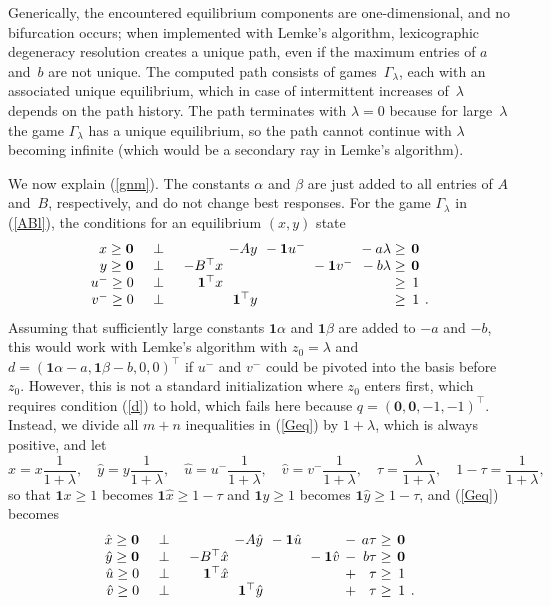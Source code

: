\documentclass[a4paper,12pt]{article}  %
\theoremstyle{definition}
\newcommand{\T}{^{\top}}
\newcommand{\0}{{\mathbf0}}
\newcommand{\1}{{\mathbf1}}
\begin{document}
Generically, the encountered equilibrium components are
one-dimensional, and no bifurcation occurs;
when implemented with Lemke's algorithm, lexicographic
degeneracy resolution creates a unique path, even if the
maximum entries of $a$ and~$b$ are not unique.
The computed path consists of games~$\Gamma_\lambda$, each
with an associated unique equilibrium, which in case of
intermittent increases of~$\lambda$ depends on the path
history.
The path terminates with $\lambda=0$ because for
large~$\lambda$ the game $\Gamma_\lambda$ has a unique
equilibrium, so the path cannot continue with $\lambda$
becoming infinite (which would be a secondary ray in Lemke's
algorithm).

We now explain (\ref{gnm}).
The constants $\alpha$ and $\beta$ are just added to all
entries of $A$ and~$B$, respectively, and do not change best
responses.
For the game $\Gamma_\lambda$ in (\ref{ABl}), the
conditions for an equilibrium $(x,y)$ state
\begin{equation}
\label{Geq}
\arraycolsep.2em
\begin{array}{rcrrllrrr}
x\ge\0&\quad\bot\quad&
&-Ay
&
{}-\1u^-
&&{}-a\lambda\ge&\0
\\
y\ge\0&\quad\bot\quad&
-B\T x&&
&{}-\1v^-
&{}-b\lambda\ge&\0&
\\
u^-\ge0&\quad\bot\quad&
\1\T x&&&&\ge&1
\\
v^-\ge0&\quad\bot\quad&
&\1\T y&&&\ge&1&.
\end{array}
\end{equation}
Assuming that sufficiently large constants $\1\alpha$ and
$\1\beta$ are added to $-a$ and $-b$, this would work with
Lemke's algorithm with $z_0=\lambda$ and
$d=(\1\alpha-a,\1\beta-b,0,0)\T$ if $u^-$ and $v^-$
could be pivoted into the basis before $z_0$.
However, this is not a standard initialization where $z_0$
enters first, which requires condition (\ref{d}) to hold,
which fails here because $q=(\0,\0,-1,-1)\T$.
Instead, we divide all $m+n$ inequalities in
(\ref{Geq}) by $1+\lambda$, which is always positive,
and let 
\begin{equation}
\label{hatxy}
\textstyle
\hat x= x\frac1{1+\lambda},\quad 
\hat y= y\frac1{1+\lambda},\quad 
\hat u= {u^-}\frac1{1+\lambda},\quad 
\hat v= {v^-}\frac1{1+\lambda},\quad 
\tau= \frac\lambda{1+\lambda},\quad
1-\tau= \frac1{1+\lambda},
\end{equation}
so that $\1x\ge1$ becomes $\1\hat x\ge1-\tau$ and 
$\1y\ge1$ becomes $\1\hat y\ge1-\tau$, and (\ref{Geq}) 
becomes
\begin{equation}
\label{Geqnew}
\arraycolsep.2em
\begin{array}{rcrrllrrrr}
\hat x\ge\0&\quad\bot\quad&
&-A\hat y
&
{}-\1\hat u
&&{}-&a\tau\ge&\0
\\
\hat y\ge\0&\quad\bot\quad&
-B\T\hat x&&
&{}-\1\hat v
&{}-&b\tau\ge&\0&
\\
\hat u\ge0&\quad\bot\quad&
\1\T\hat  x&&&&+&\tau\ge&1
\\
\hat v\ge0&\quad\bot\quad&
&\1\T \hat y&&&+&\tau\ge&1&.
\end{array}
\end{equation}
\end{document}

